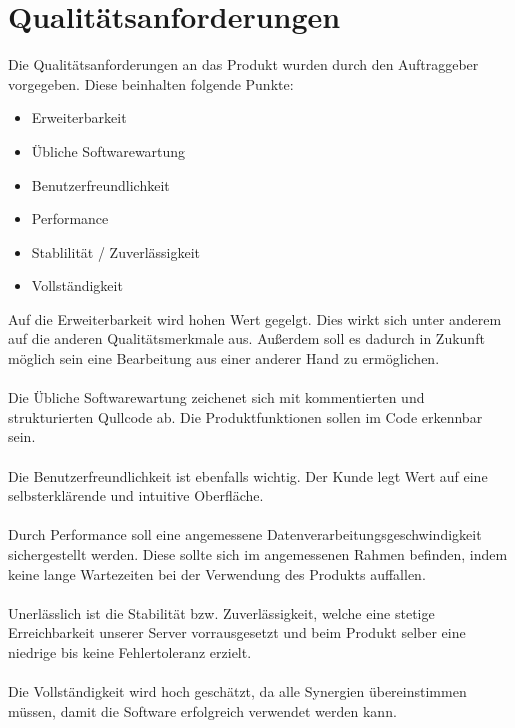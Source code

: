 \section{Qualitätsanforderungen}

    Die Qualitätsanforderungen an das Produkt wurden durch den Auftraggeber vorgegeben. Diese beinhalten folgende Punkte:

    \begin{itemize}
        \item Erweiterbarkeit
        \item Übliche Softwarewartung
        \item Benutzerfreundlichkeit
        \item Performance
        \item Stablilität / Zuverlässigkeit
        \item Vollständigkeit
    \end{itemize}
%
    Auf die Erweiterbarkeit wird hohen Wert gegelgt. Dies wirkt sich unter anderem auf die anderen Qualitätsmerkmale aus. Außerdem soll es dadurch in Zukunft möglich sein eine Bearbeitung aus einer anderer Hand zu ermöglichen.
    \\ \\
    Die Übliche Softwarewartung zeichenet sich mit kommentierten und strukturierten Qullcode ab. Die Produktfunktionen sollen im Code erkennbar sein.
    \\ \\
    Die Benutzerfreundlichkeit ist ebenfalls wichtig. Der Kunde legt Wert auf eine
    selbsterklärende und intuitive Oberfläche.
    \\ \\
    Durch Performance soll eine angemessene Datenverarbeitungsgeschwindigkeit sichergestellt werden. Diese sollte sich im angemessenen Rahmen befinden, indem keine lange Wartezeiten bei der Verwendung des Produkts auffallen.
    \\ \\
    Unerlässlich ist die Stabilität bzw. Zuverlässigkeit, welche eine stetige Erreichbarkeit unserer Server vorrausgesetzt und beim Produkt selber eine niedrige bis keine Fehlertoleranz erzielt.
    \\ \\
    Die Vollständigkeit wird hoch geschätzt, da alle Synergien übereinstimmen müssen, damit die Software erfolgreich verwendet werden kann.